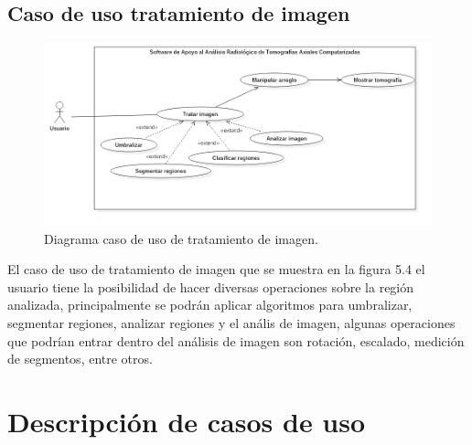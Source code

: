 \documentclass[12pt]{report}
\begin{document}
\subsection{Caso de uso tratamiento de imagen}
\begin{figure}[H]
\centering
\includegraphics[width = 13 cm, height =  10 cm]{TrataCasos}
\caption{Diagrama caso de uso de tratamiento de imagen.}
\end{figure}

El caso de uso de tratamiento de imagen que se muestra en la figura 5.4 el usuario tiene la posibilidad de hacer diversas operaciones sobre la región analizada, principalmente se podrán aplicar algoritmos para umbralizar, segmentar regiones, analizar regiones y el anális de imagen, algunas operaciones que podrían entrar dentro del análisis de imagen son rotación, escalado, medición de segmentos, entre otros.

\section{Descripción de casos de uso}
\end{document}

